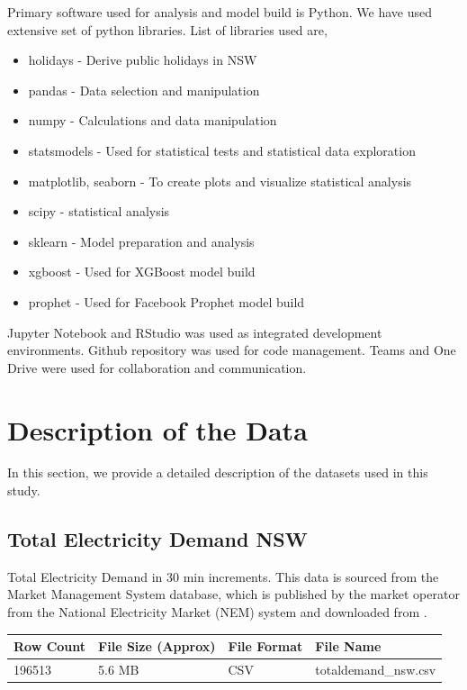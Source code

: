 \documentclass[mstat,12pt]{unswthesis}
\begin{document}
Primary software used for analysis and model build is Python. We have
used extensive set of python libraries. List of libraries used are,

\begin{itemize}
  \item holidays - Derive public holidays in NSW 
  \item pandas - Data selection and manipulation
  \item numpy - Calculations and data manipulation
  \item statsmodels - Used for statistical tests and statistical data exploration
  \item matplotlib, seaborn - To create plots and visualize statistical analysis
  \item scipy - statistical analysis
  \item sklearn - Model preparation and analysis
  \item xgboost - Used for XGBoost model build
  \item prophet - Used for Facebook Prophet model build
\end{itemize}

Jupyter Notebook and RStudio was used as integrated development
environments. Github repository was used for code management. Teams and
One Drive were used for collaboration and communication.

\section{Description of the Data}\label{description-of-the-data}

In this section, we provide a detailed description of the datasets used
in this study.

\subsection{Total Electricity Demand
NSW}\label{total-electricity-demand-nsw}

Total Electricity Demand in 30 min increments. This data is sourced from
the Market Management System database, which is published by the market
operator from the National Electricity Market (NEM) system and
downloaded from \cite{UNSW_project}.

\begin{table}[h]
\tiny
\begin{tabular}{@{}|l|l|l|l|@{}}
\toprule
\textbf{Row Count} & \textbf{File Size (Approx)} & \textbf{File Format} & \textbf{File Name}   \\ \midrule
196513             & 5.6 MB                      & CSV                  & totaldemand\_nsw.csv \\ \bottomrule
\end{tabular}
\end{table}
\end{document}
